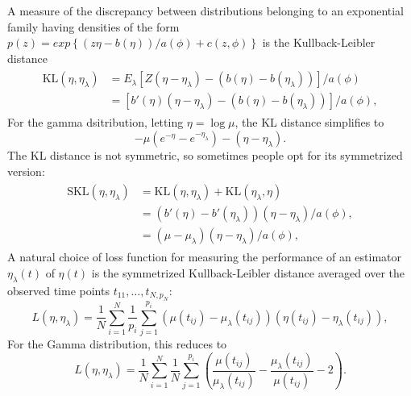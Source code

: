 A measure of the discrepancy between distributions belonging to an exponential family having densities of the form $p\left(z\right) = exp\left\{\left(z \eta - b\left(\eta\right)\right)/a\left(\phi\right) + c\left(z,\phi\right) \right\}$ is the Kullback-Leibler distance
\begin{align}
\begin{split} \label{eq:kl-distance-definition}
\mbox{KL}\left(\eta, \eta_\lambda\right) &= E_\lambda\left[Z \left(\eta - \eta_\lambda \right) - \left(b\left(\eta\right)- b\left(\eta_\lambda\right) \right)\right]/a\left(\phi\right)\\
&=\left[ b'\left(\eta\right) \left(\eta - \eta_\lambda \right) - \left(b\left(\eta\right)- b\left(\eta_\lambda\right) \right)\right]/a\left(\phi\right),
\end{split}
\end{align}
\noindent
For the gamma dsitribution, letting $\eta = \log \mu$, the KL distance simplifies to
\[
-\mu\left( e^{-\eta} - e^{-{\eta_\lambda}}\right) - \left(\eta-{\eta_\lambda}\right).
\]
\noindent
The KL distance is not symmetric, so sometimes people opt for its symmetrized version:
\begin{align}
\begin{split} \label{eq:skl-distance-definition}
\mbox{SKL}\left(\eta, \eta_\lambda\right) &= \mbox{KL}\left(\eta, \eta_\lambda\right) + \mbox{KL}\left(\eta_\lambda, \eta \right)\\
&= \left(b'\left(\eta\right) - b'\left(\eta_\lambda\right) \right)\left( \eta - \eta_\lambda\right)/a\left(\phi\right), \\
&= \left(\mu - \mu_\lambda \right)\left( \eta - \eta_\lambda\right)/a\left(\phi\right),
\end{split}
\end{align}
\noindent
A natural choice of loss function for measuring the performance of an estimator $\eta_\lambda\left(t\right)$ of $\eta \left(t\right)$ is the symmetrized Kullback-Leibler distance averaged over the observed time points $t_{11}, \dots ,  t_{N,p_N}$:
\begin{equation}\label{eq:SKL-loss-function}
L\left( \eta,\eta_\lambda \right) = \frac{1}{N}\sum_{i=1}^N \frac{1}{p_i}\sum_{j=1}^{p_i}  \left(\mu\left(t_{ij}\right) - \mu_\lambda \left(t_{ij}\right)\right)\left( \eta\left(t_{ij}\right) - \eta_\lambda\left(t_{ij}\right)\right),
\end{equation}
\noindent
For the Gamma distribution, this reduces to 
\begin{equation}\label{eq:gamma-SKL-loss-function}
L\left( \eta,\eta_\lambda \right) = \frac{1}{N}\sum_{i=1}^N \frac{1}{N}\sum_{j=1}^{p_i}  \left( \frac{\mu\left(t_{ij}\right)}{\mu_\lambda\left(t_{ij}\right)} - \frac{\mu_\lambda \left(t_{ij}\right)}{\mu\left(t_{ij}\right)} - 2\right).
\end{equation}
